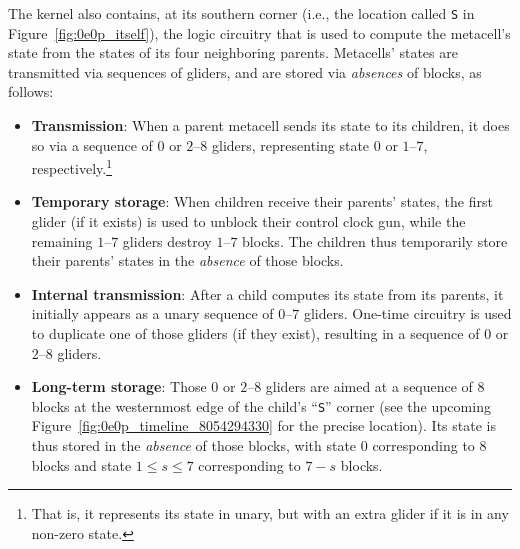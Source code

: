 The kernel also contains, at its southern corner (i.e., the location called \texttt{S} in Figure~\ref{fig:0e0p_itself}), the logic circuitry that is used to compute the metacell's state from the states of its four neighboring parents. Metacells' states are transmitted via sequences of gliders, and are stored via \emph{absences} of blocks, as follows:\smallskip

\begin{itemize}
	\item \textbf{Transmission}: When a parent metacell sends its state to its children, it does so via a sequence of $0$ or $2$--$8$ gliders, representing state $0$ or $1$--$7$, respectively.\footnote{That is, it represents its state in unary, but with an extra glider if it is in any non-zero state.}\smallskip
	
	\item \textbf{Temporary storage}: When children receive their parents' states, the first glider (if it exists) is used to unblock their control clock gun, while the remaining $1$--$7$ gliders destroy $1$--$7$ blocks. The children thus temporarily store their parents' states in the \emph{absence} of those blocks.\smallskip
	
	\item \textbf{Internal transmission}: After a child computes its state from its parents, it initially appears as a unary sequence of $0$--$7$ gliders. One-time circuitry is used to duplicate one of those gliders (if they exist), resulting in a sequence of $0$ or $2$--$8$ gliders.\smallskip
	
	\item \textbf{Long-term storage}: Those $0$ or $2$--$8$ gliders are aimed at a sequence of $8$ blocks at the westernmost edge of the child's ``\texttt{S}'' corner (see the upcoming Figure~\ref{fig:0e0p_timeline_8054294330} for the precise location). Its state is thus stored in the \emph{absence} of those blocks, with state $0$ corresponding to $8$ blocks and state $1 \leq s \leq 7$ corresponding to $7 - s$ blocks.\smallskip
\end{itemize}


